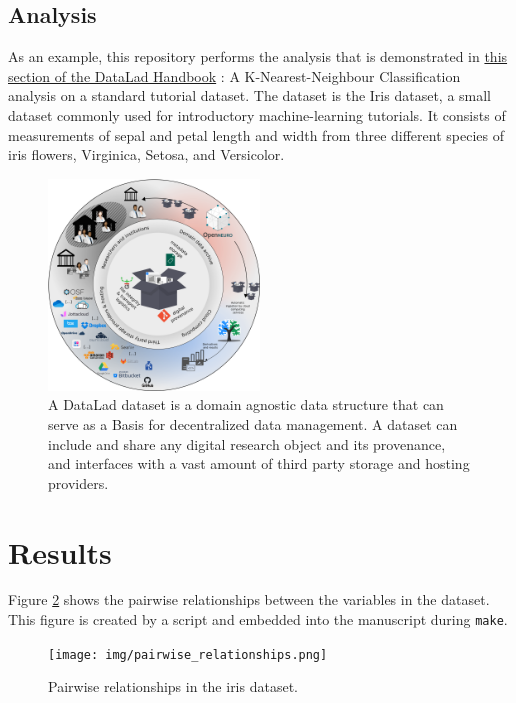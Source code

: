 \subsection*{Analysis}

As an example, this repository performs the analysis that is demonstrated in
\href{http://handbook.datalad.org/en/latest/basics/101-130-yodaproject.html}{this section of the DataLad Handbook}
\citep{handbook}:
A K-Nearest-Neighbour Classification analysis on a standard tutorial dataset.
The dataset is the Iris dataset, a small dataset commonly used for introductory
machine-learning tutorials.
It consists of measurements of sepal and petal length and width from three
different species of iris flowers, Virginica, Setosa, and Versicolor.

\begin{figure}
  \includegraphics[trim=0 0 0 0,clip,width=0.5\textwidth]{img/decentral_RDM_overview.png}
  \caption{A DataLad dataset is a domain agnostic data structure that can serve as
  a Basis for decentralized data management.
  A dataset can include and share any digital research object and its provenance,
  and interfaces with a vast amount of third party storage and hosting providers.}
  \label{fig:RDM}
\end{figure}



\section*{Results}\label{res}

%
Figure \ref{fig:relation} shows the pairwise relationships between the variables in the dataset.
This figure is created by a script and embedded into the manuscript during \texttt{make}.

\begin{figure}
  \texttt{[image: img/pairwise\_relationships.png]} \\
  \caption{Pairwise relationships in the iris dataset.}
  \label{fig:relation}
\end{figure}

